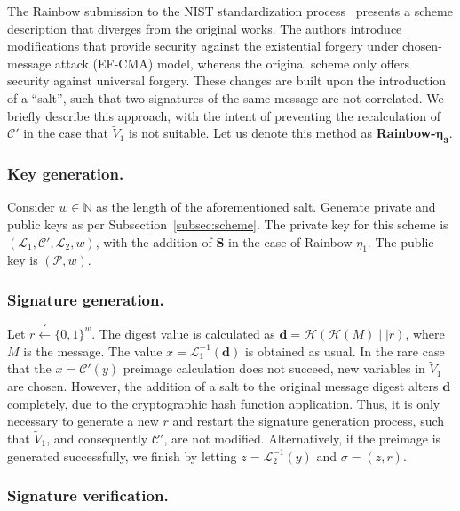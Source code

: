 \documentclass[draft, 12pt, a4paper, oneside]{memoir}
\newcommand{\random}{\overset{\mathsf{r}}{\gets}}
\theoremstyle{definition}
\begin{document}
The Rainbow submission to the NIST standardization
process~\cite{Ding:201712} presents a scheme description that diverges
from the original works. The authors introduce modifications that provide
security against the existential forgery under chosen-message attack (EF-CMA)
model, whereas the original scheme only offers security against universal
forgery. These changes are built upon the introduction of a ``salt'', such that two signatures of the same message are not correlated. We
briefly describe this approach, with the intent of preventing the
recalculation of $\mathcal{C}'$ in the case that $\widetilde{V}_{1}$ is not
suitable. Let us denote this method as \textbf{Rainbow-}$\mathbf{\eta_{3}}$.

\subsubsection{Key generation.}

Consider $w \in \mathbb{N}$ as the length of the aforementioned salt. Generate
private and public keys as per Subsection~\ref{subsec:scheme}. The private key
for this scheme is $(\mathcal{L}_{1}, \mathcal{C}', \mathcal{L}_{2}, w)$, with the
addition of $\mathbf{S}$ in the case of Rainbow-$\eta_{1}$. The public key is
$(\mathcal{P}, w)$.

\subsubsection{Signature generation.}

Let $r \random {\{0, 1\}}^{w}$. The digest value is calculated as
$\mathbf{d} = \mathcal{H}(\mathcal{H}(M) \mid\mid r)$, where $M$ is the
message. The value $x = \mathcal{L}_{1}^{-1}(\mathbf{d})$ is obtained as usual. In
the rare case that the $x = \mathcal{C}'(y)$ preimage calculation does not
succeed, new variables in $\widetilde{V}_{1}$ are chosen. However, the
addition of a salt to the original message digest alters $\mathbf{d}$
completely, due to the cryptographic hash function application. Thus, it is
only necessary to generate a new $r$ and restart the signature generation
process, such that $\widetilde{V}_{1}$, and consequently $\mathcal{C}'$, are
not modified. Alternatively, if the preimage is generated successfully, we
finish by letting $z = \mathcal{L}_{2}^{-1}(y)$ and $\sigma = (z, r)$.

\subsubsection{Signature verification.}
\end{document}
